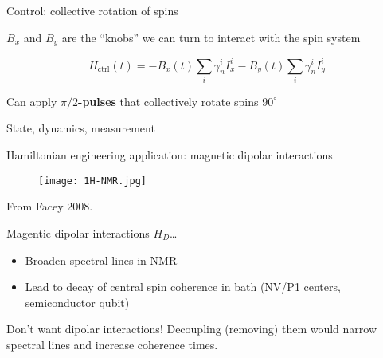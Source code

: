 \documentclass{beamer}
\begin{document}
\begin{frame}{Control: collective rotation of spins}

\begin{figure}
\centering

\end{figure}

$B_x$ and $B_y$ are the ``knobs'' we can turn to interact with the spin system

\[
    H_{\text{ctrl}}(t) = -B_x(t) \sum_i \gamma_n^i I_x^i -B_y(t) \sum_i \gamma_n^i I_y^i
\]

Can apply \textbf{$\pi/2$-pulses} that collectively rotate spins $90^\circ$

\end{frame}

\begin{frame}{State, dynamics, measurement}
%

\begin{figure}
\centering
\scalebox{.8}{

}
\end{figure}

\end{frame}

\begin{frame}{Hamiltonian engineering application: magnetic dipolar interactions}

\begin{figure}
\centering
\texttt{[image: 1H-NMR.jpg]}
\hfill
\scalebox{.6}{

}
\end{figure}
\vspace{-1em}
\hspace{3em}
{\scriptsize%
\nocite{Ottowa-NMR}
From Facey 2008.%
}

Magentic dipolar interactions $H_D$\dots
\begin{itemize}
    \item Broaden spectral lines in NMR
    \item Lead to decay of central spin coherence in bath (NV/P1 centers, semiconductor qubit)
\end{itemize}

Don't want dipolar interactions! Decoupling (removing) them would narrow spectral lines and increase coherence times.



\end{frame}
\end{document}
